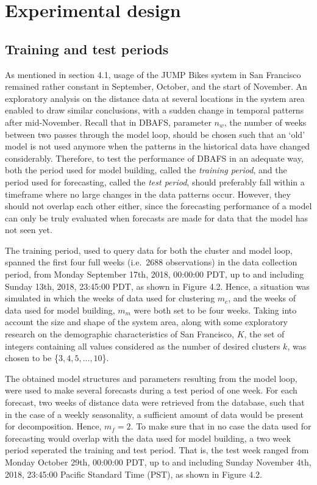 \documentclass[12pt,oneside]{reedthesis}
\begin{document}
\section{Experimental design}\label{experimental-design}

\subsection{Training and test periods}\label{training-and-test-periods}

As mentioned in section 4.1, usage of the JUMP Bikes system in San
Francisco remained rather constant in September, October, and the start
of November. An exploratory analysis on the distance data at several
locations in the system area enabled to draw similar conclusions, with a
sudden change in temporal patterns after mid-November. Recall that in
DBAFS, parameter \(n_{w}\), the number of weeks between two passes
through the model loop, should be chosen such that an `old' model is not
used anymore when the patterns in the historical data have changed
considerably. Therefore, to test the performance of DBAFS in an adequate
way, both the period used for model building, called the \emph{training
period}, and the period used for forecasting, called the \emph{test
period}, should preferably fall within a timeframe where no large
changes in the data patterns occur. However, they should not overlap
each other either, since the forecasting performance of a model can only
be truly evaluated when forecasts are made for data that the model has
not seen yet.

The training period, used to query data for both the cluster and model
loop, spanned the first four full weeks (i.e.~2688 observations) in the
data collection period, from Monday September 17th, 2018, 00:00:00 PDT,
up to and including Sunday 13th, 2018, 23:45:00 PDT, as shown in Figure
4.2. Hence, a situation was simulated in which the weeks of data used
for clustering \(m_{c}\), and the weeks of data used for model building,
\(m_{m}\) were both set to be four weeks. Taking into account the size
and shape of the system area, along with some exploratory research on
the demographic characteristics of San Francisco, \(K\), the set of
integers containing all values considered as the number of desired
clusters \(k\), was chosen to be \{\(3, 4, 5, ..., 10\)\}.

The obtained model structures and parameters resulting from the model
loop, were used to make several forecasts during a test period of one
week. For each forecast, two weeks of distance data were retrieved from
the database, such that in the case of a weekly seasonality, a
sufficient amount of data would be present for decomposition. Hence,
\(m_{f} = 2\). To make sure that in no case the data used for
forecasting would overlap with the data used for model building, a two
week period seperated the training and test period. That is, the test
week ranged from Monday October 29th, 00:00:00 PDT, up to and including
Sunday November 4th, 2018, 23:45:00 Pacific Standard Time (PST), as
shown in Figure 4.2.
\end{document}
